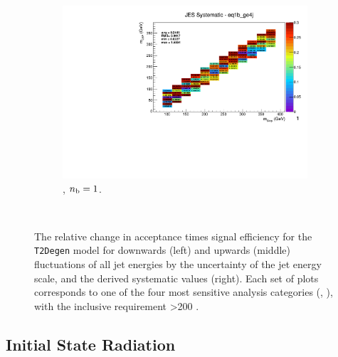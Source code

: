 \begin{figure}[ht!]
\begin{subfigure}[b]{0.32\textwidth}
    \includegraphics[width=\textwidth, page=1]{Figs/sms/t2degen/v19/systs_v2/T2_4body_JES_eq1b_ge4j.pdf}
    \caption{\njhigh, $n_{\text{b}} = 1$.}
    \label{fig:sms-jes-tdegen-ge4j-1b}
  \end{subfigure}\\
  \caption{The relative change in acceptance times signal efficiency for the
  \texttt{T2Degen} model for downwards (left) and upwards (middle) fluctuations
  of all jet energies by the uncertainty of the jet energy scale, and the 
  derived systematic values (right). Each set of plots corresponds to one of
  the four most sensitive analysis categories (\nb, \nj), with the inclusive 
  requirement \HT>200 \gev.}
  \label{fig:sms-jes-t2degen}
\end{figure}


\newpage
\subsection*{Initial State Radiation}
\label{sec:t2degen_isr_plots}

